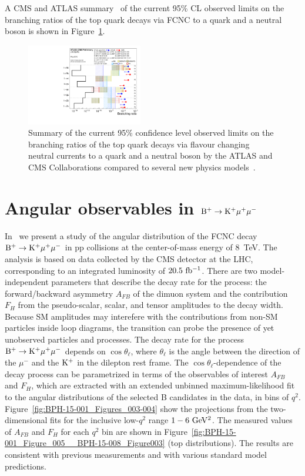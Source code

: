 \documentclass{PoS}
\begin{document}
A CMS and ATLAS summary~\cite{cms-atlas-fcnc} of the current 95\% CL observed
limits on the branching ratios of the top quark decays via FCNC to a quark and
a neutral boson is shown in Figure~\ref{fig:fcnc_summarybsm_may18}.

\begin{figure}[htb]
\centering
\includegraphics[width=0.45\textwidth]{figures/fcnc_summarybsm_may18}
\caption{
  Summary of the current 95\% confidence level observed limits on the branching
  ratios of the top quark decays via flavour changing neutral currents to a
  quark and a neutral boson by the ATLAS and CMS Collaborations compared to
  several new physics models~\cite{cms-atlas-fcnc}.
}
\label{fig:fcnc_summarybsm_may18}
\end{figure}


\section{Angular observables in ${\rm B^+ \to K^+\mu^+\mu^-}$}

In~\cite{bph-15-001} we present a study of the angular distribution of the FCNC
decay ${\rm B^+ \to K^+\mu^+\mu^-}$ in pp collisions at the center-of-mass
energy of 8~TeV. The analysis is based on data collected by the CMS detector at
the LHC, corresponding to an integrated luminosity of ${\rm 20.5~fb^{-1}}$.
There are two model-independent parameters that describe the decay rate for the
process: the forward/backward asymmetry $A_{FB}$ of the dimuon system and the
contribution $F_H$ from the pseudo-scalar, scalar, and tensor amplitudes to the
decay width. Because SM amplitudes may interefere with the contributions from
non-SM particles inside loop diagrams, the transition can probe the presence of
yet unobserved particles and processes.
The decay rate for the process ${\rm B^+ \to K^+\mu^+\mu^-}$ depends on
$\cos\theta_{\ell}$, where $\theta_{\ell}$ is the angle between the direction
of the $\mu^-$ and the ${\rm K^+}$ in the dilepton rest frame. The
$\cos\theta_{\ell}$-dependence of the decay process can be parametrized in
terms of the observables of interest $A_{FB}$ and $F_H$, which are extracted
with an extended unbinned maximum-likelihood fit to the angular distributions
of the selected B candidates in the data, in bins of $q^2$.
Figure~\ref{fig:BPH-15-001_Figures_003-004} show the projections from the
two-dimensional fits for the inclusive low-$q^2$ range ${\rm 1-6~GeV^2}$.
The measured values of $A_{FB}$ and $F_H$ for each $q^2$ bin are shown in
Figure~\ref{fig:BPH-15-001_Figure_005__BPH-15-008_Figure003}
(top distributions). The results are consistent with previous measurements and
with various standard model predictions.
\end{document}
